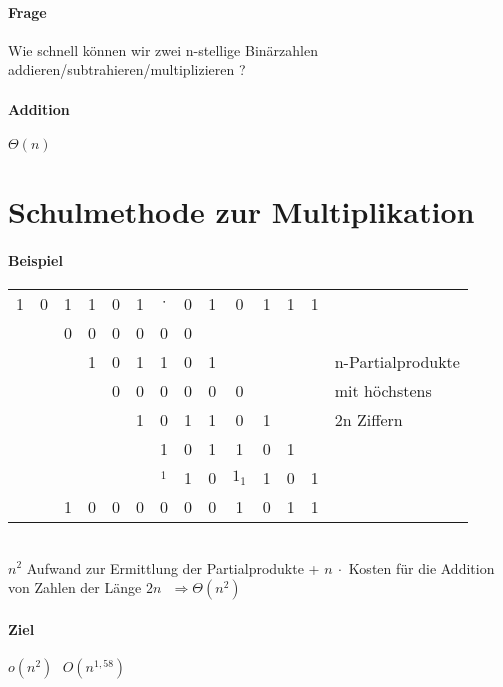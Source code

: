 \paragraph{Frage} Wie schnell können wir zwei n-stellige Binärzahlen addieren/subtrahieren/multiplizieren ?

\paragraph{Addition} $\Theta(n)$

\section{Schulmethode zur Multiplikation}
\paragraph{Beispiel}
\begin{tabular}{c c c c c c c c c c c c c | l}
  1 & 0 & 1 & 1 & 0 & 1 & $\cdot$ & 0 & 1 & 0 & 1 & 1 & 1 & \text{}\\
  \cline{1-13}
  \text{} &  \text{}  & 0 & 0 & 0 & 0 & 0 & 0 &  \text{} &  \text{} &  \text{} &  \text{} &  \text{}  & \text{} \\
  \text{} &  \text{} & \text{} & 1 & 0 & 1 & 1 & 0 & 1 &  \text{} &  \text{} &  \text{} &  \text{}  & n-Partialprodukte\\
  \text{} &  \text{}  & \text{} &  \text{} & 0 & 0 & 0 & 0 & 0 & 0 &  \text{} &  \text{} &  \text{}  & mit höchstens\\
  \text{} &  \text{} & \text{} &  \text{} &  \text{} & 1 & 0 & 1 & 1 & 0 & 1 &  \text{} &  \text{} & 2n Ziffern \\
  \text{} &  \text{} & \text{} &  \text{} &  \text{} & \text{} & 1 & 0 & 1 & 1 & 0 & 1 &  \text{} & \text{}\\
  \text{} &  \text{} & \text{} &  \text{} &  \text{} & \text{} & $\text{}_1$  & 1 & 0 & $1_1$ & 1 & 0 & 1 & \text{}\\
  \cline{1-13}
  \text{} &  \text{} & 1 &  0 & 0 & 0 & 0  & 0 & 0 & 1 & 0 & 1 & 1 & \text{}\\
\end{tabular}\\

$n^2$ Aufwand zur Ermittlung der Partialprodukte + $n~\cdot$ Kosten für die Addition von Zahlen der Länge $2n ~~~ \Rightarrow \Theta(n^2)$ 

\paragraph{Ziel} $o(n^2) ~~~ O(n^{1,58}) $



